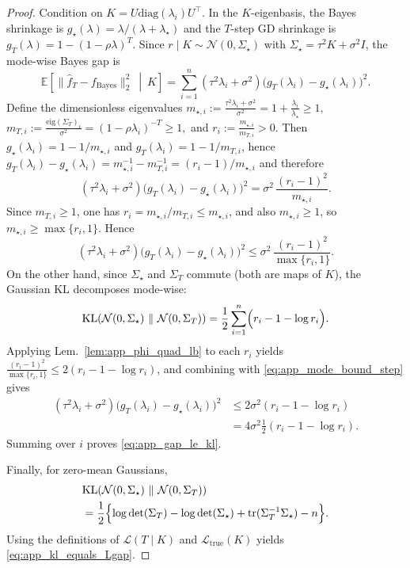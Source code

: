 \documentclass{article}
\theoremstyle{plain}
\theoremstyle{definition}
\theoremstyle{remark}
\begin{document}
\begin{proof}
Condition on $K=U\mathrm{diag}(\lambda_i)U^\top$.
In the $K$-eigenbasis, the Bayes shrinkage is $g_\star(\lambda)=\lambda/(\lambda+\lambda_\star)$ and the $T$-step GD
shrinkage is $g_T(\lambda)=1-(1-\rho\lambda)^T$.
Since $r\mid K\sim\mathcal N(0,\Sigma_\star)$ with $\Sigma_\star=\tau^2K+\sigma^2I$, the mode-wise Bayes gap is
\[
\mathbb E\!\left[\|\hat f_T-f_{\mathrm{Bayes}}\|_2^2\ \middle|\ K\right]
=
\sum_{i=1}^n (\tau^2\lambda_i+\sigma^2)\bigl(g_T(\lambda_i)-g_\star(\lambda_i)\bigr)^2.
\]
Define the dimensionless eigenvalues
$m_{\star,i}:=\frac{\tau^2\lambda_i+\sigma^2}{\sigma^2}=1+\frac{\lambda_i}{\lambda_\star}\ge 1,
$ $m_{T,i}:=\frac{\mathrm{eig}(\Sigma_T)_i}{\sigma^2}=(1-\rho\lambda_i)^{-T}\ge 1,$ and $r_i:=\frac{m_{\star,i}}{m_{T,i}}>0.$
Then $g_\star(\lambda_i)=1-1/m_{\star,i}$ and $g_T(\lambda_i)=1-1/m_{T,i}$, hence
$g_T(\lambda_i)-g_\star(\lambda_i)=m_{\star,i}^{-1}-m_{T,i}^{-1}=(r_i-1)/m_{\star,i}$ and therefore
\[
(\tau^2\lambda_i+\sigma^2)\bigl(g_T(\lambda_i)-g_\star(\lambda_i)\bigr)^2
=
\sigma^2\,\frac{(r_i-1)^2}{m_{\star,i}}.
\]
Since $m_{T,i}\ge 1$, one has $r_i=m_{\star,i}/m_{T,i}\le m_{\star,i}$, and also $m_{\star,i}\ge 1$, so
$m_{\star,i}\ge \max\{r_i,1\}$. Hence
\begin{equation}
(\tau^2\lambda_i+\sigma^2)\bigl(g_T(\lambda_i)-g_\star(\lambda_i)\bigr)^2
\le
\sigma^2\,\frac{(r_i-1)^2}{\max\{r_i,1\}}.
\label{eq:app_mode_bound_step}
\end{equation}
On the other hand, since $\Sigma_\star$ and $\Sigma_T$ commute (both are maps of $K$), the Gaussian KL decomposes
mode-wise:
\[
\mathrm{KL}\!\left(\mathcal N(0,\Sigma_\star)\ \|\ \mathcal N(0,\Sigma_T)\right)
=
\frac12\sum_{i=1}^n\Bigl(r_i-1-\log r_i\Bigr).
\]
Applying Lem.~\ref{lem:app_phi_quad_lb} to each $r_i$ yields
$\frac{(r_i-1)^2}{\max\{r_i,1\}}\le 2(r_i-1-\log r_i)$, and combining with
\eqref{eq:app_mode_bound_step} gives
\begin{align*}
(\tau^2\lambda_i+\sigma^2)\bigl(g_T(\lambda_i)-g_\star(\lambda_i)\bigr)^2
&\le
2\sigma^2(r_i-1-\log r_i)\\
&=
4\sigma^2 \frac12(r_i-1-\log r_i).
\end{align*}
Summing over $i$ proves \eqref{eq:app_gap_le_kl}.

Finally, for zero-mean Gaussians,
\begin{align}
    &\mathrm{KL}\!\left(\mathcal N(0,\Sigma_\star)\ \|\ \mathcal N(0,\Sigma_T)\right) \\
&=
\frac12\Bigl\{\log\det(\Sigma_T)-\log\det(\Sigma_\star)+\mathrm{tr}(\Sigma_T^{-1}\Sigma_\star)-n\Bigr\}.
\end{align}
Using the definitions of $\mathcal L(T\mid K)$ and $\mathcal L_{\mathrm{true}}(K)$ yields \eqref{eq:app_kl_equals_Lgap}.
\end{proof}
\end{document}
